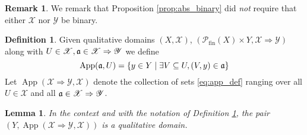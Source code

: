 \documentclass[12pt]{article}
\theoremstyle{plain}
\newtheorem{lemma}[thm]{Lemma}
\theoremstyle{definition}
\newtheorem{defn}[thm]{Definition} %
\newtheorem{remark}[thm]{Remark}
\newcommand{\scr}[1]{\mathscr{#1}}
\newcommand{\call}[1]{\mathcal{#1}}
\begin{document}
	\begin{remark}
		We remark that Proposition \ref{prop:abs_binary} did \emph{not} require that either $\scr{X}$ nor $\scr{Y}$ be binary.
	\end{remark}
	
	\begin{defn}\label{def:app}
		Given qualitative domains $(X, \scr{X})$, $(\call{P}_{\text{fin}}(X) \times Y, \scr{X} \Rightarrow \scr{Y})$ along with $U \in \scr{X}, \frak{a} \in \scr{X} \Rightarrow \scr{Y}$ we define
		\begin{equation}\label{eq:app_def}
			\operatorname{App}(\frak{a}, U) = \{ y \in Y \mid \exists V \subseteq U, (V, y) \in \frak{a} \}
			\end{equation}
		Let $\operatorname{App}(\scr{X} \Rightarrow \scr{Y}, \scr{X})$ denote the collection of sets \eqref{eq:app_def} ranging over all $U \in \scr{X}$ and all $\frak{a} \in \scr{X} \Rightarrow \scr{Y}$.
		\end{defn}
	\begin{lemma}
		In the context and with the notation of Definition \ref{def:app}, the pair $(Y, \operatorname{App}(\scr{X} \Rightarrow \scr{Y}, \scr{X}))$ is a qualitative domain.
		\end{lemma}
\end{document}
